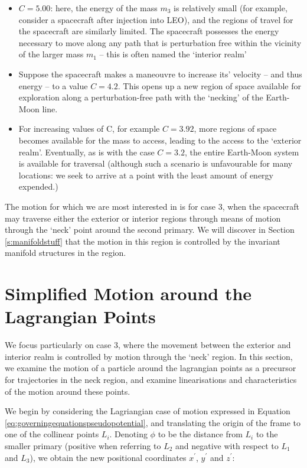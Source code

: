 \begin{itemize}
	\item $C = 5.00$: here, the energy of the mass $m_3$ is relatively small (for example, consider a spacecraft after injection into LEO), and the regions of travel for the spacecraft are similarly limited. The spacecraft possesses the energy necessary to move along any path that is perturbation free within the vicinity of the larger mass $m_1$ -- this is often named the `interior realm'
	\item Suppose the spacecraft makes a maneouvre to increase its' velocity -- and thus energy -- to a value $C = 4.2$. This opens up a new region of space available for exploration along a perturbation-free path with the `necking' of the Earth-Moon line.
	\item For increasing values of C, for example $C = 3.92$, more regions of space becomes available for the mass to access, leading to the access to the `exterior realm'. Eventually, as is with the case $C = 3.2$, the entire Earth-Moon system is available for traversal (although such a scenario is unfavourable for many locations: we seek to arrive at a point with the least amount of energy expended.)
\end{itemize}


The motion for which we are most interested in is for case 3, when the spacecraft may traverse either the exterior or interior regions through means of motion through the `neck' point around the second primary. We will discover in Section \ref{s:manifoldstuff} that the motion in this region is controlled by the invariant manifold structures in the region.

\section{Simplified Motion around the Lagrangian Points}\label{s:lagriangianmotion}

We focus particularly on case 3, where the movement between the exterior and interior realm is controlled by motion through the `neck' region. In this section, we examine the motion of a particle around the lagrangian points as a precursor for trajectories in the neck region, and examine linearisations and characteristics of the motion around these points.

We begin by considering the Lagriangian case of motion expressed in Equation \ref{eq:governingequationspseudopotential}, and translating the origin of the frame to one of the collinear points $L_i$. Denoting $\phi$ to be the distance from $L_i$ to the smaller primary (positive when referring to $L_2$ and negative with respect to $L_1$ and $L_3$), we obtain the new positional coordinates $x^\prime$, $y^\prime$ and $z^\prime$:

